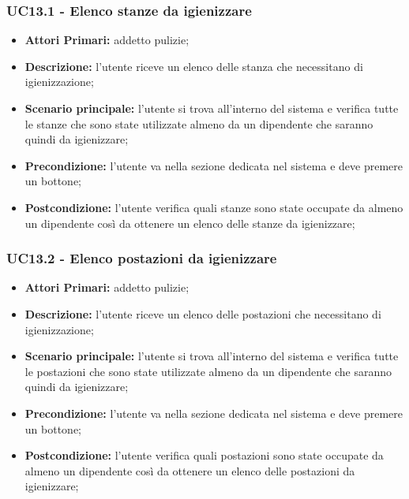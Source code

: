 \subsubsection{UC13.1 - Elenco stanze da igienizzare}
\begin{itemize}
           	\item\textbf{Attori Primari:} addetto pulizie;
           	\item\textbf{Descrizione:} l'utente riceve un elenco delle stanza che necessitano di igienizzazione;
           	\item\textbf{Scenario principale:} l'utente si trova all'interno del sistema e verifica tutte le stanze che sono state utilizzate almeno da un dipendente 				che saranno quindi da igienizzare;
           	\item\textbf{Precondizione:} l'utente va nella sezione dedicata nel sistema e deve premere un bottone;
           	\item\textbf{Postcondizione:} l'utente verifica quali stanze sono state occupate da almeno un dipendente così da ottenere un elenco delle stanze da 				igienizzare;
\end{itemize}
\subsubsection{UC13.2 - Elenco postazioni da igienizzare}
\begin{itemize}
           	\item\textbf{Attori Primari:} addetto pulizie;
           	\item\textbf{Descrizione:} l'utente riceve un elenco delle postazioni che necessitano di igienizzazione;
           	\item\textbf{Scenario principale:} l'utente si trova all'interno del sistema e verifica tutte le postazioni che sono state utilizzate almeno da un dipendente 	che saranno quindi da igienizzare;
           	\item\textbf{Precondizione:} l'utente va nella sezione dedicata nel sistema e deve premere un bottone;
           	\item\textbf{Postcondizione:} l'utente verifica quali postazioni sono state occupate da almeno un dipendente così da ottenere un elenco delle postazioni da igienizzare;
\end{itemize}

